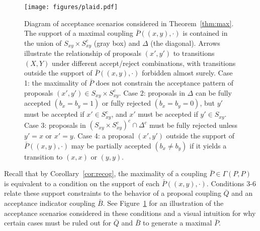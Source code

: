 \documentclass[aihp]{imsart}
\theoremstyle{plain}
\theoremstyle{remark}
\theoremstyle{definition} \newtheorem{example}{Example}
\newcommand{\cd}{\cdot}
\newcommand{\bp}{\bar P}
\newcommand{\bq}{\bar Q}
\newcommand{\bb}{\bar B}
\newcommand{\xy}{(x,y)}
\newcommand{\xyp}{(x',y')}
\newcommand{\sxy}{S_{xy}}
\begin{document}
\begin{figure}[t]
\centering
\texttt{[image: figures/plaid.pdf]}
\caption{
Diagram of acceptance scenarios considered in Theorem~\ref{thm:max}. The support of a maximal
coupling $\bp(\xy,\cd)$ is contained in the union of $\sxy \times \sxy^c$ (gray box) and $\Delta$
(the diagonal). Arrows illustrate the relationship of proposals $\xyp$ to transitions $(X,Y)$ under
different accept/reject combinations, with transitions outside the support of $\bp(\xy,\cd)$
forbidden almost surely. Case 1: the maximality of $\bp$ does not constrain the acceptance pattern
of proposals ${ \xyp \in \sxy \times \sxy^c} $. Case 2: proposals in $\Delta$ can be fully accepted
$(b_x=b_y=1)$ or fully rejected $(b_x=b_y=0)$, but $y'$ must be accepted if $x' \in S_{xy}^c$, and
$x'$ must be accepted if $y' \in S_{xy}$. Case 3: proposals in $(\sxy \times \sxy^c)^c \cap
\Delta^c$ must be fully rejected unless $y'=x$ or $x'=y$. Case 4: a proposal $\xyp$ outside the
support of $\bp(\xy, \cd)$ may be partially accepted $(b_x \neq b_y)$ if it yields a transition to
$(x,x)$ or $(y,y)$. \label{fig:plaid}
}
\end{figure}

Recall that by Corollary~\ref{cor:recog}, the maximality of a coupling $\bp \in \Gamma(P,P)$ is
equivalent to a condition on the support of each $\bp(\xy,\cd)$. Conditions 3-6 relate these support
constraints to the behavior of a proposal coupling $\bq$ and an acceptance indicator coupling $\bb$.
See Figure~\ref{fig:plaid} for an illustration of the acceptance scenarios considered in these
conditions and a visual intuition for why certain cases must be ruled out for $\bq$ and $\bb$ to
generate a maximal $\bp$.
\end{document}
